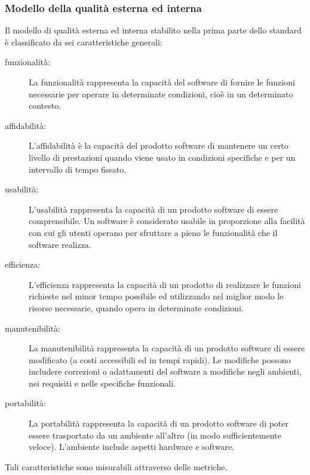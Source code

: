 \documentclass[../PianoDiQualifica.tex]{subfiles}
\begin{document}
\begin{appendices}
		\subsubsection{Modello della qualità esterna ed interna}
		Il modello di qualità esterna ed interna stabilito nella prima parte dello standard è classificato da sei caratteristiche generali:
		\begin{description}
			\item[funzionalità:] La funzionalità rappresenta la capacità del software di fornire le funzioni necessarie per operare in determinate condizioni, cioè in un determinato contesto.
			\item[affidabilità:] L'affidabilità è la capacità del prodotto software di mantenere un certo livello di prestazioni quando viene usato in condizioni specifiche e per un intervallo di tempo fissato.
			\item[usabilità:] L'usabilità rappresenta la capacità di un prodotto software di essere comprensibile. Un software è considerato usabile in proporzione alla facilità con cui gli utenti operano per sfruttare a pieno le funzionalità che il software realizza.
			\item[efficienza:] L'efficienza rappresenta la capacità di un prodotto di realizzare le funzioni richieste nel minor tempo possibile ed utilizzando nel miglior modo le risorse necessarie, quando opera in determinate condizioni.
			\item[manutenibilità:] La manutenibilità rappresenta la capacità di un prodotto software di essere modificato (a costi accessibili ed in tempi rapidi). Le modifiche possono includere correzioni o adattamenti del software a modifiche negli ambienti, nei requisiti e nelle specifiche funzionali.
			\item[portabilità:] La portabilità rappresenta la capacità di un prodotto software di poter essere trasportato da un ambiente all'altro (in modo sufficientemente veloce). L'ambiente include aspetti hardware e software.
		\end{description}
		Tali caratteristiche sono misurabili attraverso delle metriche.
		

\end{appendices}
\end{document}
